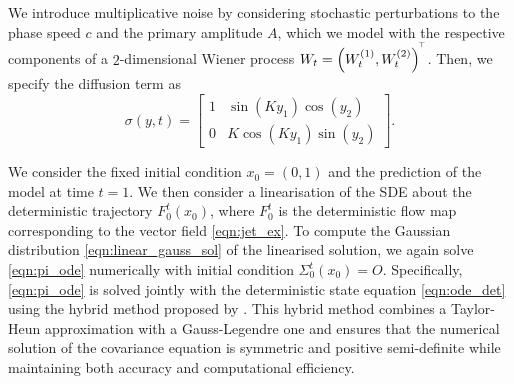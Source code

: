 We introduce multiplicative noise by considering stochastic perturbations to the phase speed \(c\) and the primary amplitude \(A\), which we model with the respective components of a \(2\)-dimensional Wiener process \(W_t = \left(W_t^{(1)}, W_t^{(2)}\right)^{^{\!\top}}\).
Then, we specify the diffusion term as
\begin{equation}
	\sigma\!\left(y,t\right) = \begin{bmatrix}
		1 & \sin\!\left(Ky_1\right)\cos\!\left(y_2\right)  \\
		0 & K\cos\!\left(Ky_1\right)\sin\!\left(y_2\right)
	\end{bmatrix}.
	\label{eqn:jet_ex_sigma}
\end{equation}


We consider the fixed initial condition \(x_0 = \left(0, 1\right)\) and the prediction of the model at time \(t = 1\).
We then consider a linearisation of the SDE about the deterministic trajectory \(F_0^t\!\left(x_0\right)\), where \(F_0^t\) is the deterministic flow map corresponding to the vector field \cref{eqn:jet_ex}.
To compute the Gaussian distribution \cref{eqn:linear_gauss_sol} of the linearised solution, we again solve \cref{eqn:pi_ode} numerically with initial condition \(\Sigma_0^t\!\left(x_0\right) = O\).
Specifically, \cref{eqn:pi_ode} is solved jointly with the deterministic state equation \cref{eqn:ode_det} using the hybrid method proposed by \citet{Mazzoni_2008_ComputationalAspectsContinuous}.
This hybrid method combines a Taylor-Heun approximation with a Gauss-Legendre one and ensures that the numerical solution of the covariance equation is symmetric and positive semi-definite while maintaining both accuracy and computational efficiency.


